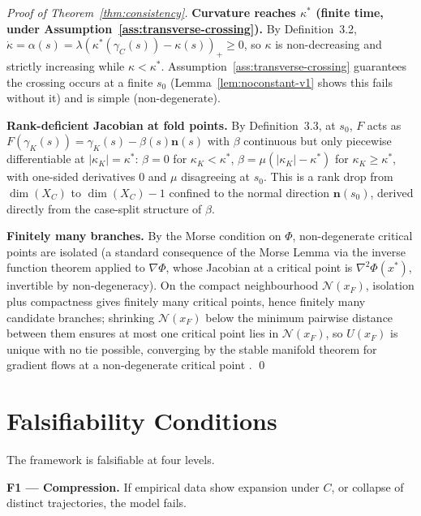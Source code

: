 \documentclass[14pt,a4paper]{extarticle}
\begin{document}
\begin{proof}[Proof of Theorem~\ref{thm:consistency}]
\textbf{Curvature reaches $\kappa^*$ (finite time, under
Assumption~\ref{ass:transverse-crossing}).} By
Definition~3.2, $\dot\kappa = \alpha(s) =
\lambda(\kappa^*(\gamma_C(s))-\kappa(s))_+ \geq 0$, so $\kappa$ is
non-decreasing and strictly increasing while $\kappa<\kappa^*$.
Assumption~\ref{ass:transverse-crossing} guarantees the crossing occurs
at a finite $s_0$ (Lemma~\ref{lem:noconstant-v1} shows this fails without
it) and is simple (non-degenerate).

\textbf{Rank-deficient Jacobian at fold points.} By
Definition~3.3, at $s_0$, $F$ acts as $F(\gamma_K(s)) =
\gamma_K(s)-\beta(s)\mathbf{n}(s)$ with $\beta$ continuous but only
piecewise differentiable at $|\kappa_K|=\kappa^*$: $\beta=0$ for
$\kappa_K<\kappa^*$, $\beta=\mu(|\kappa_K|-\kappa^*)$ for
$\kappa_K\geq\kappa^*$, with one-sided derivatives $0$ and $\mu$
disagreeing at $s_0$. This is a rank drop from $\dim(X_C)$ to
$\dim(X_C)-1$ confined to the normal direction $\mathbf{n}(s_0)$,
derived directly from the case-split structure of $\beta$.

\textbf{Finitely many branches.} By the Morse condition on $\Phi$,
non-degenerate critical points are isolated (a standard consequence of
the Morse Lemma via the inverse function theorem applied to
$\nabla\Phi$, whose Jacobian at a critical point is $\nabla^2\Phi(x^*)$,
invertible by non-degeneracy). On the compact neighbourhood
$\mathcal{N}(x_F)$, isolation plus compactness gives finitely many
critical points, hence finitely many candidate branches; shrinking
$\mathcal{N}(x_F)$ below the minimum pairwise distance between them
ensures at most one critical point lies in $\mathcal{N}(x_F)$, so
$U(x_F)$ is unique with no tie possible, converging by the stable
manifold theorem for gradient flows at a non-degenerate critical point
\cite{Milnor1963,Palais1968}.
\qed
\end{proof}

\section{Falsifiability Conditions}
\label{sec:falsifiability}

The framework is falsifiable at four levels.

\textbf{F1 --- Compression.}
If empirical data show expansion under $C$, or collapse of distinct
trajectories, the model fails.
\end{document}
